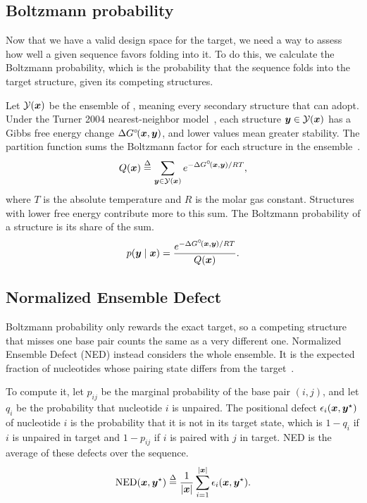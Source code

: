 \subsection{Boltzmann probability}\label{sec:boltzmann}
Now that we have a valid design space for the target, we need a way to assess how well a given sequence favors folding into it. To do this, we calculate the Boltzmann probability, which is the probability that the sequence folds into the target structure, given its competing structures.

Let $\mathcal{Y}(\boldsymbol{{x}})$ be the ensemble of \vecx, meaning every secondary structure that \vecx can adopt. Under the Turner 2004 nearest-neighbor model~\citep{mathews2004}, each structure $\boldsymbol{{y}}\in\mathcal{Y}(\boldsymbol{{x}})$ has a Gibbs free energy change $\Delta\,\! G^{\scriptstyle\circ\!}(\boldsymbol{{x}},\boldsymbol{{y}})$, and lower values mean greater stability. The partition function sums the Boltzmann factor for each structure in the ensemble~\citep{mccaskill1990}.
\begin{equation}
Q(\boldsymbol{{x}})\stackrel{\Delta}{=}\sum_{\boldsymbol{{y}}\in\mathcal{Y}(\boldsymbol{{x}})}e^{-\Delta\,\! G^{\scriptstyle\circ\!}(\boldsymbol{{x}},\boldsymbol{{y}})/RT},
\label{eq:partition}
\end{equation}
where $T$ is the absolute temperature and $R$ is the molar gas constant. Structures with lower free energy contribute more to this sum. The Boltzmann probability of a structure \vecy is its share of the sum.
\begin{equation}
p(\boldsymbol{{y}}\mid\boldsymbol{{x}})=\frac{e^{-\Delta\,\! G^{\scriptstyle\circ\!}(\boldsymbol{{x}},\boldsymbol{{y}})/RT}}{Q(\boldsymbol{{x}})}.
\label{eq:probability}
\end{equation}

\subsection{Normalized Ensemble Defect}\label{sec:ned}
Boltzmann probability only rewards the exact target, so a competing structure that misses  one base pair counts the same as a very different one.
Normalized Ensemble Defect (NED) instead considers the whole ensemble.
It is the expected fraction of nucleotides whose pairing state differs from the target~\citep{dirks2004,zadeh2011}.

To compute it, let $p_{ij}$ be the marginal probability of 
the base pair $(i,j)$, and let $q_i$ be the probability that nucleotide $i$ is unpaired. The positional defect $\epsilon_i(\boldsymbol{{x}},\boldsymbol{{y}}^\star)$ of  nucleotide $i$ is the probability that it is not in its target state, which is $1-q_i$ if
$i$ is unpaired in target
and $1-p_{ij}$ if $i$ is paired with $j$ in target.
NED is the average of these defects over the sequence.
\begin{equation}
\text{NED}(\boldsymbol{{x}},\boldsymbol{{y}}^\star)\stackrel{\Delta}{=}\frac{1}{|\boldsymbol{{x}}|}\sum_{i=1}^{|\boldsymbol{{x}}|}\epsilon_i(\boldsymbol{{x}},\boldsymbol{{y}}^\star).
\label{eq:ned}
\end{equation}

